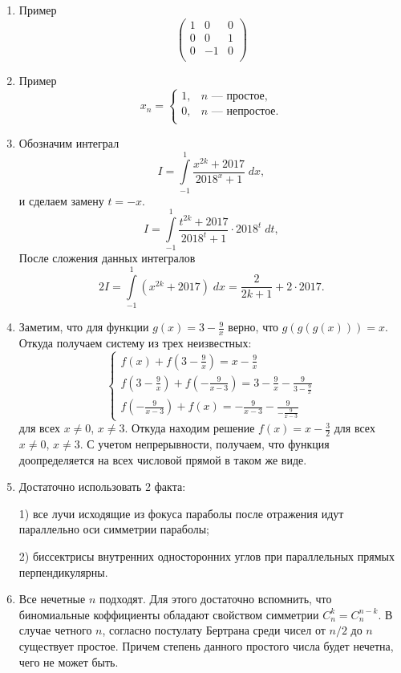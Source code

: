 \begin{enumerate}
\item Пример
$$
\begin{pmatrix}
1 & 0  & 0 \\
0 &  0 & 1 \\
0 & -1 & 0 \\
\end{pmatrix}
$$

\item Пример
$$
x_n = 
\begin{cases}
1, & n \text{ --- простое},\\
0, & n \text{ --- непростое}.\\ 
\end{cases}
$$

\item Обозначим интеграл
$$
I = \int\limits_{-1}^{1} \frac{x^{2k} + 2017}{2018^x + 1} \;dx ,
$$
и сделаем замену $t = -x$.
$$
I = \int\limits_{-1}^{1} \frac{t^{2k} + 2017}{2018^t + 1} \cdot 2018^t \;dt ,
$$
После сложения данных интегралов 
$$2I = \int\limits_{-1}^{1} (x^{2k} + 2017) \;dx = \frac{2}{2k+1} + 2 \cdot 2017.$$

\item Заметим, что для функции $g(x) = 3 - \frac{9}{x}$ верно, что $g(g(g(x))) = x$. Откуда получаем систему из трех неизвестных:
$$
\begin{cases}
f(x) + f\left(3 - \frac{9}{x}\right) = x - \frac{9}{x} \\
f\left(3 - \frac{9}{x}\right) + f\left(-\frac{9}{x - 3}\right) = 3 - \frac{9}{x} - \frac{9}{3 - \frac{9}{x}} \\
f\left(-\frac{9}{x - 3}\right) + f\left(x\right) = -\frac{9}{x - 3} - \frac{9}{-\frac{9}{x - 3}}
\end{cases}
$$
для всех $x \neq 0$, $x \neq 3$. Откуда находим решение $f(x) = x - \frac32$ для всех $x \neq 0$, $x \neq 3$. С учетом непрерывности, получаем, что функция доопределяется на всех числовой прямой в таком же виде.

\item Достаточно использовать 2 факта: 

1) все лучи исходящие из фокуса параболы после отражения идут параллельно оси симметрии параболы; 

2) биссектрисы внутренних односторонних углов при параллельных прямых перпендикулярны.

\item Все нечетные $n$ подходят. Для этого достаточно вспомнить, что биномиальные коффициенты обладают свойством симметрии $C_{n}^k = C_{n}^{n-k}$. В случае четного $n$, согласно постулату Бертрана среди чисел от $n/2$ до $n$ существует простое. Причем степень данного простого числа будет нечетна, чего не может быть.


\end{enumerate}
